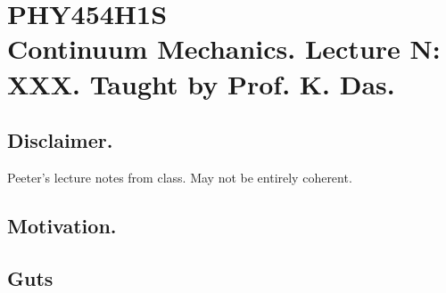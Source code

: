 
%

\chapter{PHY454H1S\\Continuum Mechanics.  Lecture {N}: XXX.  Taught by Prof. K. Das.}
\label{chap:continuumL{N}}
{}
\date{Jan XX, 2012}

\beginArtWithToc

\section{Disclaimer.}

Peeter's lecture notes from class.  May not be entirely coherent.

\section{Motivation.}

\section{Guts}

\EndArticle
